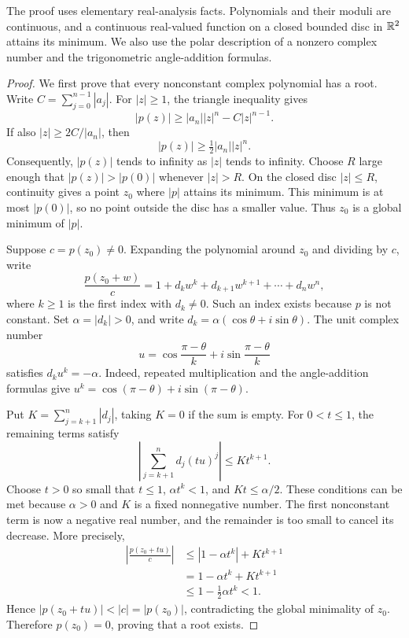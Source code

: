 \begin{pendingreview}
The proof uses elementary real-analysis facts. Polynomials and their moduli
are continuous, and a continuous real-valued function on a closed bounded
disc in \(\mathbb{R}^2\) attains its minimum. We also use the polar description
of a nonzero complex number and the trigonometric angle-addition formulas.

\begin{proof}
  We first prove that every nonconstant complex polynomial has a root.
  Write \(C=\sum_{j=0}^{n-1}|a_j|\). For \(|z|\ge1\), the triangle
  inequality gives
  \[
    |p(z)|\ge |a_n||z|^n-C|z|^{n-1}.
  \]
  If also \(|z|\ge 2C/|a_n|\), then
  \[
    |p(z)|\ge \tfrac12|a_n||z|^n.
  \]
  Consequently, \(|p(z)|\) tends to infinity as \(|z|\) tends to
  infinity. Choose \(R\) large enough that
  \(|p(z)|>|p(0)|\) whenever \(|z|>R\). On the closed disc
  \(|z|\le R\), continuity gives a point \(z_0\) where \(|p|\)
  attains its minimum. This minimum is at most \(|p(0)|\), so no point
  outside the disc has a smaller value. Thus \(z_0\) is a global
  minimum of \(|p|\).

  Suppose \(c=p(z_0)\ne0\). Expanding the polynomial around \(z_0\)
  and dividing by \(c\), write
  \[
    \frac{p(z_0+w)}{c}
      =1+d_kw^k+d_{k+1}w^{k+1}+\cdots+d_nw^n,
  \]
  where \(k\ge1\) is the first index with \(d_k\ne0\).
  Such an index exists because \(p\) is not constant. Set
  \(\alpha=|d_k|>0\), and write
  \(d_k=\alpha(\cos\theta+i\sin\theta)\). The unit complex number
  \[
    u=\cos\frac{\pi-\theta}{k}
        +i\sin\frac{\pi-\theta}{k}
  \]
  satisfies \(d_ku^k=-\alpha\). Indeed, repeated multiplication and
  the angle-addition formulas give
  \(u^k=\cos(\pi-\theta)+i\sin(\pi-\theta)\).

  Put \(K=\sum_{j=k+1}^n|d_j|\), taking \(K=0\) if the sum is
  empty. For \(0<t\le1\), the remaining terms satisfy
  \[
    \left|\sum_{j=k+1}^n d_j(tu)^j\right|
      \le Kt^{k+1}.
  \]
  Choose \(t>0\) so small that \(t\le1\),
  \(\alpha t^k<1\), and \(Kt\le\alpha/2\).
  These conditions can be met because \(\alpha>0\) and \(K\) is a
  fixed nonnegative number. The first nonconstant term is now a negative
  real number, and the remainder is too small to cancel its decrease.
  More precisely,
  \[
    \begin{aligned}
      \left|\frac{p(z_0+tu)}{c}\right|
        &\le |1-\alpha t^k|+Kt^{k+1}\\
        &=1-\alpha t^k+Kt^{k+1}\\
        &\le1-\tfrac12\alpha t^k<1.
    \end{aligned}
  \]
  Hence \(|p(z_0+tu)|<|c|=|p(z_0)|\), contradicting the global
  minimality of \(z_0\). Therefore \(p(z_0)=0\), proving that a root
  exists.


\end{proof}
\end{pendingreview}
